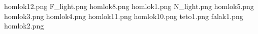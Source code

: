 homlok12.png
F_light.png
homlok8.png
homlok1.png
N_light.png
homlok5.png
homlok3.png
homlok4.png
homlok11.png
homlok10.png
teto1.png
falak1.png
homlok2.png
